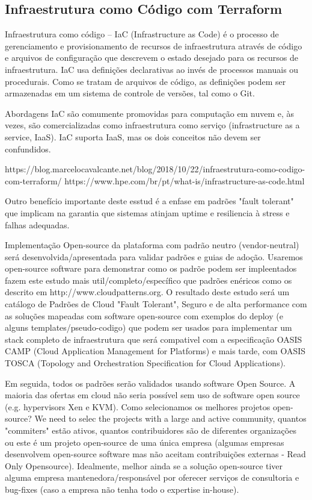 \documentclass[12pt]{article}
\begin{document}
	\subsection{Infraestrutura como Código com Terraform}
	
	Infraestrutura como código – IaC (Infrastructure as Code) é o processo de gerenciamento e provisionamento de recursos de infraestrutura através de código e arquivos de configuração que descrevem o estado desejado para os recursos de infraestrutura. IaC usa definições declarativas ao invés de processos manuais ou procedurais. Como se tratam de arquivos de código, as definições podem ser armazenadas em um sistema de controle de versões, tal como o Git.
	
	Abordagens IaC são comumente promovidas para computação em nuvem e, às vezes, são comercializadas como infraestrutura como serviço (infrastructure as a service, IaaS). IaC suporta IaaS, mas os dois conceitos não devem ser confundidos.
	
	https://blog.marcelocavalcante.net/blog/2018/10/22/infraestrutura-como-codigo-com-terraform/
	https://www.hpe.com/br/pt/what-is/infrastructure-as-code.html
	

	Outro benefício importante deste esstud é a enfase em padrões "fault tolerant" que implicam na garantia que sistemas atinjam uptime e resiliencia à stress e falhas adequadas. 
	
	Implementação Open-source da plataforma com padrão neutro (vendor-neutral) será desenvolvida/apresentada para validar padrões e guias de adoção. Usaremos open-source software para demonstrar como os padrõe podem ser impleentados fazem este estudo mais util/completo/específico que padrões enéricos como os descrito em http://www.cloudpatterns.org.
	O resultado deste estudo será um catálogo de Padrões de Cloud "Fault Tolerant", Seguro e de alta performance com as soluções mapeadas com software open-source com exemplos do deploy (e alguns templates/pseudo-codigo) que podem ser usados para implementar um stack completo de infraestrutura que será compativel com a especificação OASIS CAMP (Cloud Application Management for Platforms) e mais tarde, com OASIS TOSCA (Topology and Orchestration Specification for Cloud Applications).
	
	Em seguida, todos os padrões serão validados usando software Open Source. A maioria das ofertas em cloud não seria possível sem uso de software open source (e.g. hypervisors Xen e KVM). Como selecionamos os melhores projetos open-source? We need to selec the projects with a large and active community, quantos "commiters" estão ativos, quantos contribuidores são de diferentes organizações ou este é um projeto open-source de uma única empresa (algumas empresas desenvolvem open-source software mas não aceitam contribuições externas - Read Only Opensource). Idealmente, melhor ainda se a solução open-source tiver alguma empresa mantenedora/responsável por oferecer serviços de consultoria e bug-fixes (caso a empresa não tenha todo o expertise in-house). 
	
\end{document}
